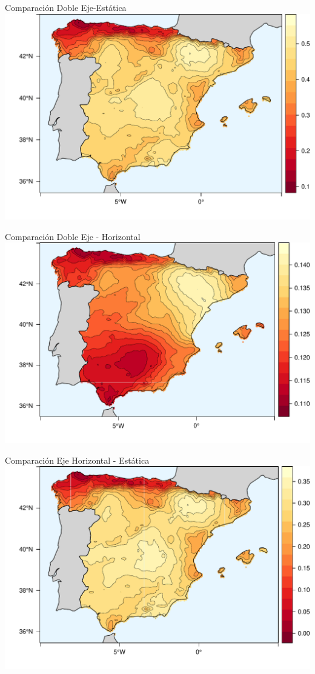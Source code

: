 \documentclass[xcolor={usenames,svgnames,dvipsnames}]{beamer}
\begin{document}
\begin{frame}[label=sec-4-1-1]{Comparación Doble Eje-Estática}
\includegraphics[width=.9\linewidth]{../figs/TwoFixed.pdf}
\end{frame}



\begin{frame}[label=sec-4-1-2]{Comparación Doble Eje - Horizontal}
\includegraphics[width=.9\linewidth]{../figs/TwoHoriz.pdf}
\end{frame}



\begin{frame}[label=sec-4-1-3]{Comparación Eje Horizontal - Estática}
\includegraphics[width=.9\linewidth]{../figs/HorizFixed.pdf}
\end{frame}
\end{document}
